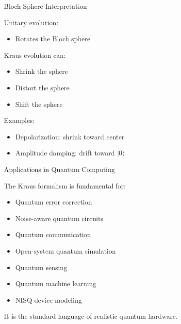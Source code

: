 \documentclass{beamer}
\begin{document}
\begin{frame}{Bloch Sphere Interpretation}

Unitary evolution:
\begin{itemize}
    \item Rotates the Bloch sphere
\end{itemize}

\vspace{0.4cm}

Kraus evolution can:
\begin{itemize}
    \item Shrink the sphere
    \item Distort the sphere
    \item Shift the sphere
\end{itemize}

\vspace{0.4cm}

Examples:
\begin{itemize}
    \item Depolarization:
    shrink toward center
    
    \item Amplitude damping:
    drift toward \(|0\rangle\)
\end{itemize}

\end{frame}

\begin{frame}{Applications in Quantum Computing}

The Kraus formalism is fundamental for:

\begin{itemize}
    \item Quantum error correction
    \item Noise-aware quantum circuits
    \item Quantum communication
    \item Open-system quantum simulation
    \item Quantum sensing
    \item Quantum machine learning
    \item NISQ device modeling
\end{itemize}

\vspace{0.3cm}

It is the standard language of realistic quantum hardware.

\end{frame}
\end{document}
